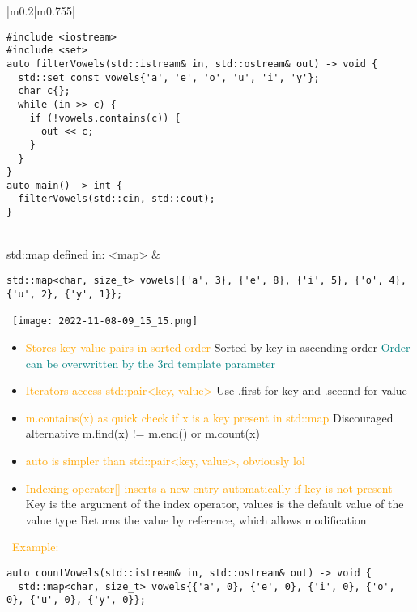 \documentclass[main.tex,fontsize=8pt,paper=a4,paper=portrait,DIV=calc]{scrartcl}
\begin{document}
\begin{table}[ht!]
\begin{tabular}{|m{0.2\linewidth}|m{0.755\linewidth}|}
\begin{lstlisting}
#include <iostream>
#include <set>
auto filterVowels(std::istream& in, std::ostream& out) -> void {
  std::set const vowels{'a', 'e', 'o', 'u', 'i', 'y'};
  char c{};
  while (in >> c) {
    if (!vowels.contains(c)) {
      out << c;
    }
  }
}
auto main() -> int {
  filterVowels(std::cin, std::cout);
}
\end{lstlisting}\\
\hline
std::map  \newline 
defined in: <map> &
\begin{lstlisting}
std::map<char, size_t> vowels{{'a', 3}, {'e', 8}, {'i', 5}, {'o', 4}, {'u', 2}, {'y', 1}};
\end{lstlisting}
\, \newline
\texttt{[image: 2022-11-08-09\_15\_15.png]}\newline
\begin{itemize}
\item \textcolor{Orange}{Stores key-value pairs in sorted order}\newline
  Sorted by key in ascending order\newline
  \textcolor{teal}{Order can be overwritten by the 3rd template parameter}
\item \textcolor{Orange}{Iterators access std::pair<key, value>}\newline
  Use .first for key and .second for value
\item \textcolor{orange}{m.contains(x) as quick check if x is a key present in std::map}\newline
  Discouraged alternative m.find(x) != m.end() or m.count(x)
\item \textcolor{orange}{auto is simpler than std::pair<key, value>, obviously lol}
\item \textcolor{orange}{Indexing operator[] inserts a new entry automatically if key is not present}\newline
  Key is the argument of the index operator, values is the default value of the value type\newline
  Returns the value by reference, which allows modification
\vspace{-2mm}
\end{itemize} 
\, \newline
\textcolor{orange}{Example:}\newline
\begin{lstlisting}
auto countVowels(std::istream& in, std::ostream& out) -> void {
  std::map<char, size_t> vowels{{'a', 0}, {'e', 0}, {'i', 0}, {'o', 0}, {'u', 0}, {'y', 0}};

\end{lstlisting}
\end{tabular}
\end{table}
\end{document}
